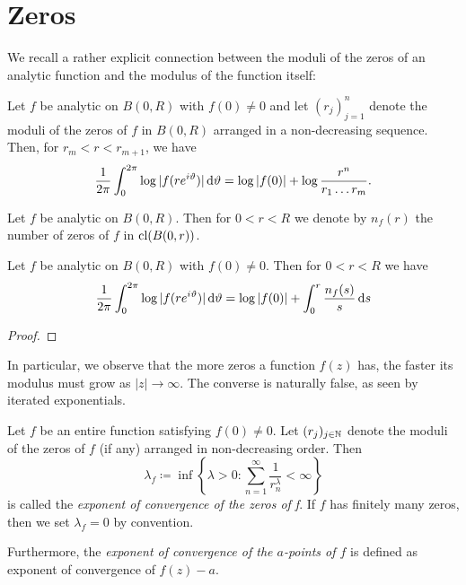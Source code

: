 \chapter{Zeros}
\label{ch:zeros}

We recall a rather explicit connection between the moduli of the zeros of an analytic function and the modulus of the function itself:

\begin{theorem}[Jensen]
    Let $f$ be analytic on $B(0, R)$ with $f(0) \neq 0$ and let $(r_j)_{j=1}^n$ denote the moduli of the zeros of $f$ in $B(0, R)$ arranged in a non-decreasing sequence. Then, for $r_m < r < r_{m+1}$, we have
    $$ \frac{1}{2 \pi} \int_0^{2\pi} \log \vert f(r e^{i \vartheta}) \vert \mathop{}\!\mathrm{d} \vartheta = \log \vert f(0) \vert + \log \frac{r^n}{r_1 \hdots r_m}. $$
\end{theorem}

\begin{definition}
    Let $f$ be analytic on $B(0, R)$. Then for $0 < r < R$ we denote by $n_f(r)$ the number of zeros of $f$ in $\operatorname{cl}(B(0,r))$.
\end{definition}

\begin{corollary}
    Let $f$ be analytic on $B(0, R)$ with $f(0) \neq 0$. Then for $0 < r < R$ we have
    $$ \frac{1}{2 \pi} \int_0^{2\pi} \log \vert f(re^{i \vartheta}) \vert \mathop{}\!\mathrm{d} \vartheta = \log \vert f(0) \vert + \int_0^r \frac{n_f(s)}{s} \mathop{}\!\mathrm{d} s $$
\end{corollary}

\begin{proof}
\end{proof}

In particular, we observe that the more zeros a function $f(z)$ has, the faster its modulus must grow as $\vert z \vert \to \infty$. The converse is naturally false, as seen by iterated exponentials.

\begin{definition}
    Let $f$ be an entire function satisfying $f(0) \neq 0$. Let $(r_j)_{j \in \mathbb{N}}$ denote the moduli of the zeros of $f$ (if any) arranged in non-decreasing order. Then
    $$ \lambda_f \coloneqq \inf \left\{ \lambda > 0 : \sum_{n=1}^\infty \frac{1}{r^\lambda_n} < \infty \right\} $$
    is called the \emph{exponent of convergence of the zeros of f}. If $f$ has finitely many zeros, then we set $\lambda_f = 0$ by convention. 

    Furthermore, the \emph{exponent of convergence of the $a$-points of $f$} is defined as exponent of convergence of $f(z) - a$.
\end{definition}


